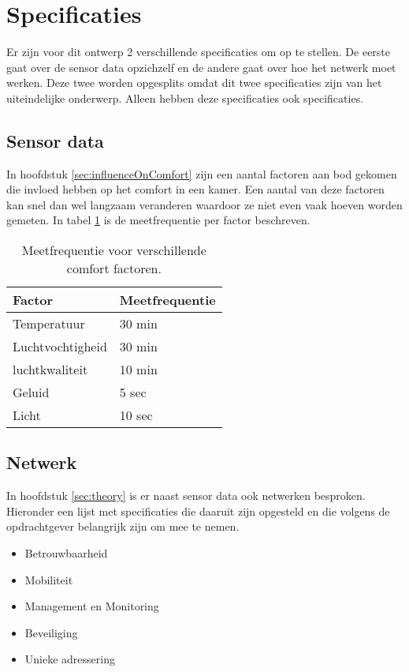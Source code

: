 \section{Specificaties}

Er zijn voor dit ontwerp 2 verschillende specificaties om op te stellen. De eerste gaat over de sensor data opzichzelf en de andere gaat over hoe 
het netwerk moet werken. Deze twee worden opgesplits omdat dit twee specificaties zijn van het uiteindelijke onderwerp. Alleen hebben deze specificaties 
ook specificaties.

\subsection{Sensor data}
In hoofdstuk \ref{sec:influenceOnComfort} zijn een aantal factoren aan bod gekomen die invloed hebben op het comfort in een kamer. Een aantal van deze factoren kan snel dan wel langzaam veranderen waardoor ze niet even vaak hoeven worden gemeten. In tabel \ref{tabel:meetfrequentie} is de meetfrequentie per factor beschreven.
\begin{table}[h]
    \centering
    \begin{tabular}{|l|l|}\hline
        Factor           & Meetfrequentie \\\hline
        Temperatuur      & 30 min         \\\hline
        Luchtvochtigheid & 30 min         \\\hline
        luchtkwaliteit   & 10 min         \\\hline
        Geluid           & 5 sec          \\\hline
        Licht            & 10 sec         \\\hline
    \end{tabular}
    \caption{Meetfrequentie voor verschillende comfort factoren.}
    \label{tabel:meetfrequentie}
\end{table}

\subsection{Netwerk}
In hoofdstuk \ref{sec:theory} is er naast sensor data ook netwerken besproken. Hieronder een lijst met specificaties die daaruit zijn 
opgesteld en die volgens de opdrachtgever belangrijk zijn om mee te nemen.
\begin{itemize}
    \item Betrouwbaarheid
    \item Mobiliteit
    \item Management en Monitoring
    \item Beveiliging
    \item Unieke adressering
\end{itemize}

